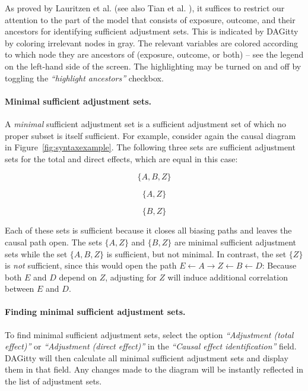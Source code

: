 \documentclass[a4paper]{article} %
\newcommand{\pp}{{\sc DAG}itty\xspace}
\newcommand{\action}[1]{\emph{``#1''}}
\begin{document}
As proved by Lauritzen et al. \cite{Lauritzen1990} 
(see also Tian et al. \cite{TianPP1998}), 
it suffices to restrict our attention to the part of the model that consists of exposure, 
outcome, and their ancestors for identifying sufficient adjustment sets. This is indicated
by \pp by coloring irrelevant nodes in gray. The relevant variables are colored according 
to which node they are ancestors of (exposure, outcome, or both) -- see the legend on the 
left-hand side of the screen. The highlighting may be turned on and off by toggling the 
\action{highlight ancestors} checkbox.

\paragraph{Minimal sufficient adjustment sets.} 

A \emph{minimal} sufficient adjustment set is a sufficient 
adjustment set of which no proper subset is itself sufficient. For example, 
consider again the causal diagram in Figure~\ref{fig:syntaxexample}. 
The following three sets are sufficient adjustment sets
for the total and direct effects, which are equal in this case: 

$$ \{A,B,Z\} $$

$$ \{A,Z\} $$

$$ \{B,Z\} $$ 

Each of these sets is sufficient because it closes all biasing paths and leaves 
the causal path open. The sets $\{A,Z\}$ and $\{B,Z\}$ are minimal sufficient adjustment 
sets while the set $\{A,B,Z\}$ is sufficient, but not minimal. 
In contrast, the set $\{Z\}$ is \emph{not} sufficient, since this would 
open  
the path $E \leftarrow A \rightarrow Z \leftarrow B \leftarrow D$: 
Because both $E$ and 
$D$ depend on $Z$, adjusting for $Z$ will induce 
additional correlation between $E$ and $D$. 

\paragraph{Finding minimal sufficient adjustment sets.}

To find minimal sufficient adjustment sets, select the 
option \action{Adjustment (total effect)}
or \action{Adjustment (direct effect)} in the 
\action{Causal effect identification} field. 
\pp
will then calculate all minimal sufficient adjustment sets and display 
them in that field. Any changes made to the diagram will be instantly
reflected in the list of adjustment sets.
\end{document}
